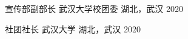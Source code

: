

\begin{cvhonors}

  \cvhonor
    {宣传部副部长} %
    {武汉大学校团委} %
    {湖北，武汉} %
    {2020} %

  \cvhonor
    {社团社长} %
    {武汉大学} %
    {湖北，武汉} %
    {2020} %

\end{cvhonors}
